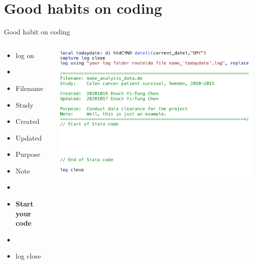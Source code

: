 \section{Good habits on coding}
\begin{frame}[allowframebreaks]{Good habit on coding}
\begin{columns}
	\begin{column}{0.3\textwidth} 
	\begin{itemize}
	\item log on
	\item[] 
	\item Filename
	\item Study
	\item Created
	\item Updated
	\item Purpose
	\item Note
	\item[] 
	\item \textbf{Start your code}
	\item[] 
	\item log close
	\end{itemize}
	\end{column}
	
	\begin{column}{0.7\textwidth} 
			\includegraphics[scale=0.5]{image/header}
	\end{column}

\end{columns}

\newpage


\end{frame}
